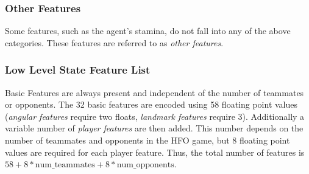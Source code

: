\documentclass[12pt]{article}
\begin{document}
\subsubsection{Other Features}

Some features, such as the agent's stamina, do not fall into any of
the above categories. These features are referred to as \textit{other
  features}.

\subsubsection{Low Level State Feature List}

Basic Features are always present and independent of the number of
teammates or opponents. The 32 basic features are encoded using 58
floating point values (\textit{angular features} require two floats,
\textit{landmark features} require 3). Additionally a variable number
of \textit{player features} are then added. This number depends on the
number of teammates and opponents in the HFO game, but 8 floating
point values are required for each player feature. Thus, the total
number of features is $58 + 8*\textrm{num\_teammates} +
8*\textrm{num\_opponents}$.
\end{document}
